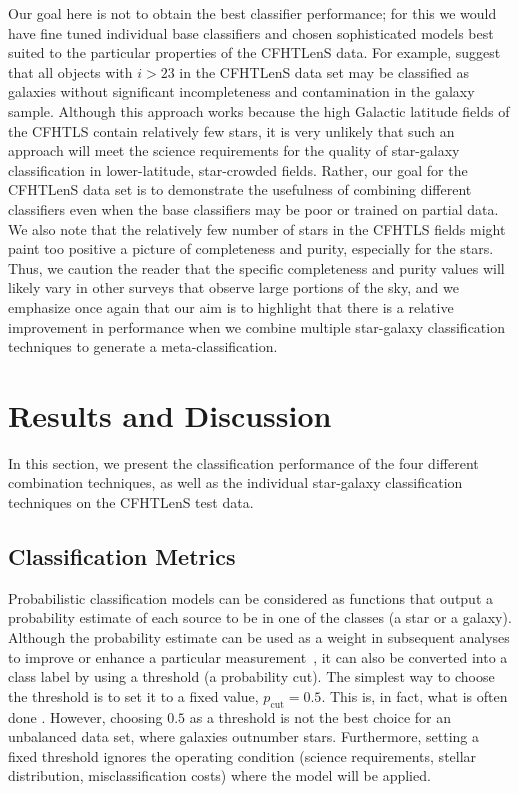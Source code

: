 Our goal here is not to obtain the best classifier
performance; for this we would have fine tuned individual base
classifiers and chosen sophisticated models best suited to the
particular properties of the CFHTLenS data.
For example, \cite{hildebrandt2012cfhtlens} suggest that
all objects with $i > 23$ in the CFHTLenS data set
may be classified as galaxies
without significant incompleteness and contamination in the galaxy sample.
Although this approach works because
the high Galactic latitude fields of the CFHTLS contain
relatively few stars,
it is very unlikely that such an approach
will meet the science requirements for the quality of
star-galaxy classification in lower-latitude, star-crowded fields.
Rather, our goal for the CFHTLenS data set
is to demonstrate the usefulness
of combining different classifiers even when
the base classifiers may be poor or trained on partial data.
We also note that the relatively few number of stars
in the CFHTLS fields might paint too positive a picture of completeness and purity,
especially for the stars.
Thus, we caution the reader that the specific completeness and purity values
will likely vary in other surveys that observe large portions of the sky,
and we emphasize once again that our aim is to highlight that there is a
relative improvement in performance when we combine multiple star-galaxy
classification techniques to generate a meta-classification.

\section{Results and Discussion}
  \label{section:results_and_discussion}

In this section, we present the classification performance of
the four different combination techniques,
as well as the individual star-galaxy classification techniques
on the CFHTLenS test data.


\subsection{Classification Metrics}

Probabilistic classification models can be considered as
functions that output a probability estimate of each source
to be in one of the classes (\eg a star or a galaxy).
Although the probability estimate can be used as a weight 
in subsequent analyses to improve or enhance
a particular measurement~\citep{ross2011ameliorating},
it can also be converted into a class label
by using a threshold (a probability cut).
The simplest way to choose the threshold is to set it to a fixed value,
\eg $p_\mathrm{cut} = 0.5$.
This is, in fact, what is often done
\citep[\eg][]{henrion2011bayesian, Fadely2012}.
However, choosing $0.5$ as a threshold is not the best choice
for an unbalanced data set, where galaxies outnumber stars.
Furthermore, setting a fixed threshold ignores the operating condition 
(\eg science requirements, stellar distribution, misclassification costs)
where the model will be applied.


